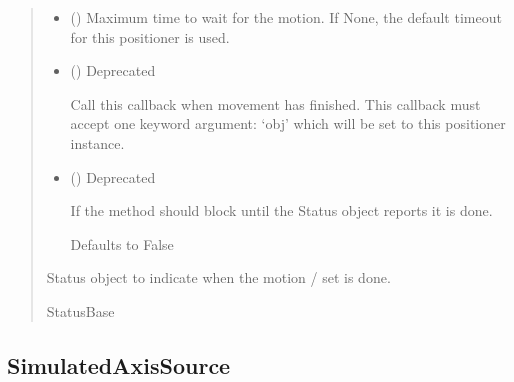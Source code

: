 \documentclass[letterpaper,10pt,english]{sphinxmanual}
\begin{document}
\begin{fulllineitems}
\begin{fulllineitems}
\begin{quote}
\begin{description}
\begin{itemize}
\item {} 
\sphinxAtStartPar
{} (\sphinxstyleliteralemphasis{\sphinxupquote{, }}) \textendash{} Maximum time to wait for the motion. If None, the default timeout
for this positioner is used.

\item {} 
\sphinxAtStartPar
{} (\sphinxstyleliteralemphasis{\sphinxupquote{, }}) \textendash{} 
\sphinxAtStartPar
Deprecated

\sphinxAtStartPar
Call this callback when movement has finished. This callback
must accept one keyword argument: ‘obj’ which will be set to
this positioner instance.


\item {} 
\sphinxAtStartPar
{} (\sphinxstyleliteralemphasis{\sphinxupquote{, }}) \textendash{} 
\sphinxAtStartPar
Deprecated

\sphinxAtStartPar
If the method should block until the Status object reports
it is done.

\sphinxAtStartPar
Defaults to False


\end{itemize}

\sphinxAtStartPar
{} \textendash{} Status object to indicate when the motion / set is done.

\sphinxAtStartPar
StatusBase

\end{description}\end{quote}

\end{fulllineitems}


\end{fulllineitems}



\subsection{SimulatedAxisSource}
\label{\detokenize{API:simulatedaxissource}}
\end{document}
